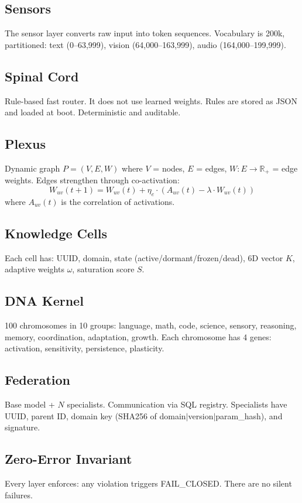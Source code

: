 \documentclass[11pt,a4paper]{article}
\begin{document}
\subsection{Sensors}
The sensor layer converts raw input into token sequences.
Vocabulary is 200k, partitioned: text (0--63,999), vision
(64,000--163,999), audio (164,000--199,999).

\subsection{Spinal Cord}
Rule-based fast router. It does not use learned weights.
Rules are stored as JSON and loaded at boot. Deterministic
and auditable.

\subsection{Plexus}
Dynamic graph $P = (V, E, W)$ where $V$ = nodes, $E$ = edges,
$W: E \to \mathbb{R}_+$ = edge weights. Edges strengthen
through co-activation:
\begin{equation}
W_{uv}(t+1) = W_{uv}(t) + \eta_e \cdot (A_{uv}(t) - \lambda \cdot W_{uv}(t))
\end{equation}
where $A_{uv}(t)$ is the correlation of activations.

\subsection{Knowledge Cells}
Each cell has: UUID, domain, state (active/dormant/frozen/dead),
6D vector $K$, adaptive weights $\omega$, saturation score $S$.

\subsection{DNA Kernel}
100 chromosomes in 10 groups: language, math, code, science,
sensory, reasoning, memory, coordination, adaptation, growth.
Each chromosome has 4 genes: activation, sensitivity,
persistence, plasticity.

\subsection{Federation}
Base model + $N$ specialists. Communication via SQL registry.
Specialists have UUID, parent ID, domain key
(SHA256 of domain$|$version$|$param\_hash), and signature.

\subsection{Zero-Error Invariant}
Every layer enforces: any violation triggers FAIL\_CLOSED.
There are no silent failures.
\end{document}

